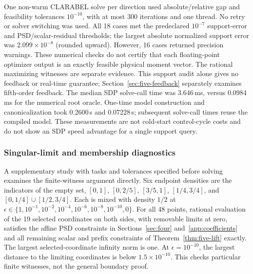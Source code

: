 \documentclass[pdflatex,sn-mathphys-num]{sn-jnl}
\theoremstyle{thmstyleone}
\theoremstyle{thmstyletwo}\newtheorem{remark}[theorem]{Remark}
\begin{document}
One non-warm CLARABEL solve per direction used absolute/relative gap and
feasibility tolerances $10^{-10}$, with at most 300 iterations and one thread.
No retry or solver switching was used. All 18 cases met the predeclared
$10^{-7}$ support-error and PSD/scalar-residual thresholds; the largest
absolute normalized support error was $2.099\times10^{-8}$ (rounded upward).
However, 16 cases returned precision warnings. These numerical checks do not
certify that each floating-point optimizer output is an exactly feasible
physical moment vector. The rational maximizing witnesses are separate
evidence. This support audit alone gives no feedback or real-time guarantee;
Section~\ref{sec:five-feedback} separately examines fifth-order feedback.
The median SDP solve-call time was 3.646\,ms, versus 0.0984\,ms for the
numerical root oracle. One-time model construction and canonicalization took
0.2600\,s and 0.07228\,s; subsequent solve-call times reuse the compiled model.
These measurements are not cold-start control-cycle costs and do not show
an SDP speed advantage for a single support query.

\subsubsection{Singular-limit and membership diagnostics}\label{sec:boundary-paths}
A supplementary study with tasks and tolerances specified before solving
examines the finite-witness argument directly. Six endpoint densities are the indicators
of the empty set, $[0,1]$, $[0,2/5]$, $[3/5,1]$, $[1/4,3/4]$, and
$[0,1/4]\cup[1/2,3/4]$. Each is mixed with density $1/2$ at
$\epsilon\in\{1,10^{-1},10^{-2},10^{-4},10^{-6},10^{-8},10^{-10},0\}$.
For all 48 points, rational evaluation of the 19 selected coordinates on
both sides, with removable limits at zero, satisfies the affine PSD
constraints in Sections~\ref{sec:four} and~\ref{app:coefficients}
and all remaining scalar and prefix constraints of
Theorem~\ref{thm:five-lift} exactly.
The largest selected-coordinate infinity norm is one. At $\epsilon=10^{-10}$,
the largest distance to the limiting coordinates is below $1.5\times10^{-10}$.
This checks particular finite witnesses, not the general boundary proof.
\end{document}
